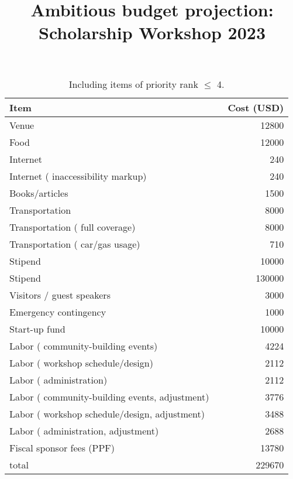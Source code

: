 \documentclass[10pt]{article}
\title{Ambitious budget projection: Scholarship Workshop 2023}
\date{}
\begin{document}
\maketitle

\vspace{-1pc}

\begin{table}[h]
\begin{center}
\begin{tabular}{llr}
Item & & Cost (USD) \\ \hline
Venue &  & 12800 \\
Food &  & 12000 \\
Internet &  & 240 \\
Internet ( inaccessibility markup) &  & 240 \\
Books/articles &  & 1500 \\
Transportation &  & 8000 \\
Transportation ( full coverage) &  & 8000 \\
Transportation ( car/gas usage) &  & 710 \\
Stipend &  & 10000 \\
Stipend &  & 130000 \\
Visitors / guest speakers &  & 3000 \\
Emergency contingency &  & 1000 \\
Start-up fund &  & 10000 \\
Labor ( community-building events) &  & 4224 \\
Labor ( workshop schedule/design) &  & 2112 \\
Labor ( administration) &  & 2112 \\
Labor ( community-building events, adjustment) &  & 3776 \\
Labor ( workshop schedule/design, adjustment) &  & 3488 \\
Labor ( administration, adjustment) &  & 2688 \\
Fiscal sponsor fees (PPF) &  & 13780 \\ \hline
total &  & 229670
\end{tabular}
\end{center}
\caption{Including items of priority rank $\leq$ 4.}\label{capcap}
\end{table}
\end{document}
